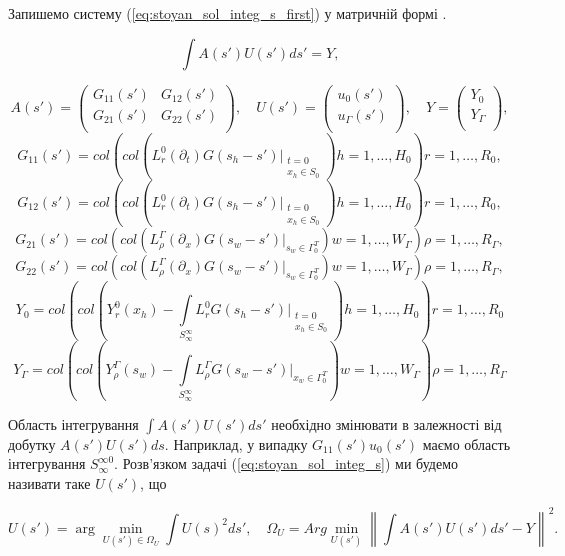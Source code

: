 Запишемо систему (\ref{eq:stoyan_sol_integ_s_first}) у матричній формі \cite{Stoyan-Modeliuvannia}.

\begin{equation}
\label{eq:stoyan_sol_integ_s}
\int A(s')U(s')ds' = Y,
\end{equation}

\[
A(s') =
\left(
\begin{array}{cc}
G_{11}(s') & G_{12}(s') \\
G_{21}(s') & G_{22}(s') \\
\end{array}
\right),
\quad
U(s')=
\left(
\begin{array}{c}
u_{0}(s')  \\
u_{\Gamma}(s') \\
\end{array}
\right),
\quad
Y=
\left(
\begin{array}{c}
Y_0 \\
Y_\Gamma \\
\end{array}
\right),
\]
\[
G_{11}(s')=col\left(col\left(L_r^0(\partial_t)G(s_h-s')\bigg|_{\substack{t=0\\x_h\in S_0}}\right)h=1,\ldots,H_0\right)r=1,\ldots,R_0,
\]
\[
G_{12}(s')=col\left(col\left(L_r^0(\partial_t)G(s_h-s')\bigg|_{\substack{t=0\\x_h\in S_0}}\right)h=1,\ldots,H_0\right)r=1,\ldots,R_0,
\]
\[
G_{21}(s')=col\left(col\left(L_\rho^\Gamma(\partial_x)G(s_w-s')\bigg|_{s_w\in\Gamma_0^T}\right)w=1,\ldots,W_\Gamma\right)\rho=1,\ldots,R_\Gamma,
\]
\[
G_{22}(s')=col\left(col\left(L_\rho^\Gamma(\partial_x)G(s_w-s')\bigg|_{s_w\in\Gamma_0^T}\right)w=1,\ldots,W_\Gamma\right)\rho=1,\ldots,R_\Gamma,
\]
\[
Y_0=col\left(col\left(Y_r^0(x_h) - \int\limits_{S_\infty^\infty}L_r^0G(s_h-s')\bigg|_{\substack{t=0\\x_h\in S_0}}\right)h=1,\ldots,H_0\right)r=1,\ldots,R_0
\]
\[
Y_\Gamma=col\left(col\left(Y_\rho^\Gamma(s_w) - \int\limits_{S_\infty^\infty}L_\rho^\Gamma G(s_w-s')\bigg|_{x_w\in \Gamma_0^T}\right)w=1,\ldots,W_\Gamma\right)\rho=1,\ldots,R_\Gamma
\]


Область інтегрування $\int A(s')U(s')ds'$ необхідно змінювати в залежності від добутку $A(s')U(s')ds$.
Наприклад, у випадку $G_{11}(s')u_0(s')$ маємо область інтегрування $S_{\infty}^{\infty 0}$.
Розв’язком задачі (\ref{eq:stoyan_sol_integ_s}) ми будемо називати таке $U(s')$, що

\[
U(s') = \arg\min_{U(s') \in \Omega_U}\int U(s)^2ds',\quad
\Omega_U = Arg \min_{U(s')}\left\|\int A(s')U(s')ds' - Y\right\|^2.
\]

